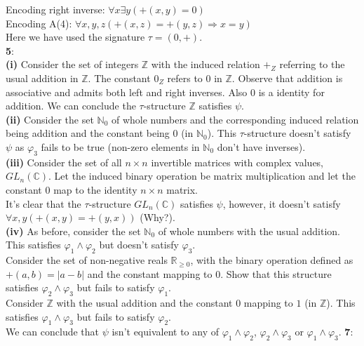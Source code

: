 \documentclass{article}
\begin{document}
\begin{flushleft}
Encoding right inverse: $\forall x\exists y(+(x,y)=0)$\\
Encoding A(4): $\forall x,y,z(+(x,z)=+(y,z)\Rightarrow x=y)$\\
Here we have used the signature $\tau=(0,+)$.\\
\textbf{5}:\\
\textbf{(i)} Consider the set of integers $\mathbb{Z}$ with the induced relation $+_Z$ referring to the usual addition in $\mathbb{Z}$. The constant $0_Z$ refers to $0$ in $\mathbb{Z}$. Observe that addition is associative and admits both left and right inverses. Also $0$ is a identity for addition.
We can conclude the $\tau$-structure $\mathbb{Z}$ satisfies $\psi$.\\
\textbf{(ii)} Consider the set $\mathbb{N}_0$ of whole numbers and the corresponding induced relation being addition and the constant being $0$ (in $\mathbb{N}_0$). This $\tau$-structure doesn't satisfy $\psi$ as $\varphi_3$ fails to be true (non-zero elements in $\mathbb{N}_0$ don't have inverses).\\
\textbf{(iii)} Consider the set of all $n\times n$ invertible matrices with complex values, $GL_n(\mathbb{C})$. Let the induced binary operation be matrix multiplication and let the constant $0$ map to the identity $n\times n$ matrix.\\
It's clear that the $\tau$-structure $GL_n(\mathbb{C})$ satisfies $\psi$, however, it doesn't satisfy $\forall x,y(+(x,y)=+(y,x))$ (Why?).\\
\textbf{(iv)} As before, consider the set $\mathbb{N}_0$ of whole numbers with the usual addition. This satisfies $\varphi_1\wedge\varphi_2$ but doesn't satisfy $\varphi_3$.\\
Consider the set of non-negative reals $\mathbb{R}_{\geq0}$, with the binary operation defined as $+(a,b)=|a-b|$ and the constant mapping to $0$. Show that this structure satisfies $\varphi_2\wedge \varphi_3$ but fails to satisfy $\varphi_1$.\\
Consider $\mathbb{Z}$ with the usual addition and the constant $0$ mapping to $1$ (in $\mathbb{Z}$). This satisfies $\varphi_1\wedge\varphi_3$ but fails to satisfy $\varphi_2$.\\
We can conclude that $\psi$ isn't equivalent to any of $\varphi_1\wedge\varphi_2$, $\varphi_2\wedge\varphi_3$ or $\varphi_1\wedge\varphi_3$.
\clearpage
\textbf{7}:



\end{flushleft}
\end{document}
